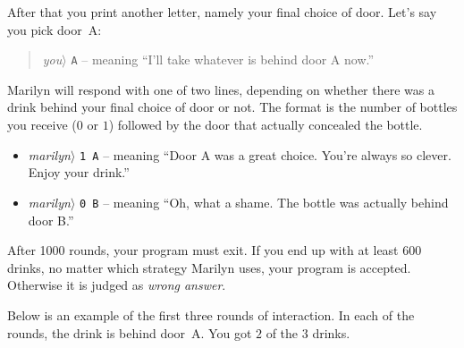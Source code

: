 After that you print another letter, namely your final choice of door.
Let's say you pick door~A:
\begin{quote}
  \emph{you}$\rangle$ \verb|A| -- meaning ``I'll take whatever is behind door A now.'' 
\end{quote}
Marilyn will respond with one of two lines, depending on whether there was a drink behind your final choice of door or not.
The format is the number of bottles you receive ($0$ or $1$) followed by the door that actually concealed the bottle.
\begin{itemize}
  \item \emph{marilyn}$\rangle$ \verb|1 A| -- meaning ``Door A  was a great choice. You're always so clever. Enjoy your drink.''
\item \emph{marilyn}$\rangle$ \verb|0 B| -- meaning ``Oh, what a shame. The bottle was actually behind door B.''
\end{itemize}
After 1000 rounds, your program must exit. 
If you end up with at least 600 drinks, no matter which strategy Marilyn uses, your program is accepted.
Otherwise it is judged as \emph{wrong answer}.

\medskip
Below is an example of the first three rounds of interaction.
In each of the rounds, the drink is behind door~A.
You got $2$ of the $3$ drinks.
